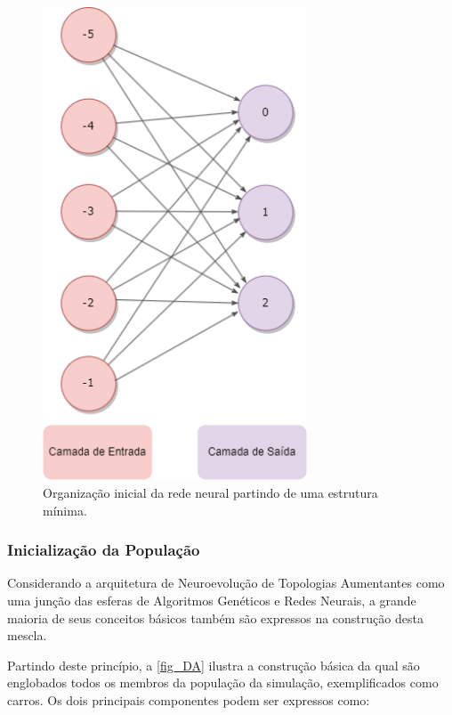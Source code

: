 \begin{figure}[htb]
        \centering
        \caption{\label{fig_CC}Organização inicial da rede neural partindo de uma estrutura mínima.}
        \includegraphics[width=0.7\textwidth]{images/CC.png}
\end{figure}

\subsubsection{Inicialização da População}
Considerando a arquitetura de Neuroevolução de Topologias Aumentantes como uma junção das esferas de Algoritmos
Genéticos e Redes Neurais, a grande maioria de seus conceitos básicos também são expressos na construção desta mescla.

Partindo deste princípio, a \autoref{fig_DA} ilustra a construção básica da qual são englobados todos os membros
da população da simulação, exemplificados como carros. Os dois principais componentes podem ser expressos como:

